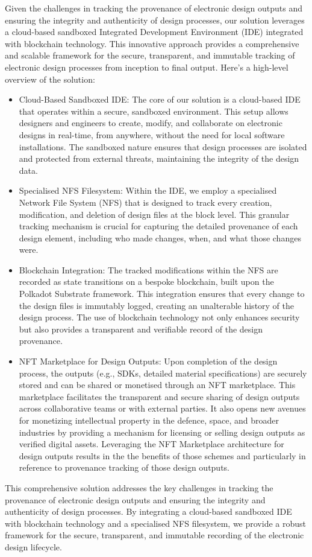 \documentclass{tufte-handout}
\begin{document}
Given the challenges in tracking the provenance of electronic design outputs and ensuring the integrity and authenticity of design processes, our solution
leverages a cloud-based sandboxed Integrated Development Environment (IDE) integrated with blockchain technology. This innovative approach provides a
comprehensive and scalable framework for the secure, transparent, and immutable tracking of electronic design processes from inception to final output. Here's a
high-level overview of the solution:
\begin{itemize}
    \item Cloud-Based Sandboxed IDE: The core of our solution is a cloud-based IDE that operates within a secure, sandboxed environment. This setup allows
    designers and engineers to create, modify, and collaborate on electronic designs in real-time, from anywhere, without the need for local software
    installations. The sandboxed nature ensures that design processes are isolated and protected from external threats, maintaining the integrity
    of the design data.
    \item Specialised NFS Filesystem: Within the IDE, we employ a specialised Network File System (NFS) that is designed to track every creation, modification,
    and deletion of design files at the block level. This granular tracking mechanism is crucial for capturing the detailed provenance of each design element,
    including who made changes, when, and what those changes were.
    \item Blockchain Integration: The tracked modifications within the NFS are recorded as state transitions on a bespoke blockchain, built upon the Polkadot
    Substrate framework. This integration ensures that every change to the design files is immutably logged, creating an unalterable history of the design process.
    The use of blockchain technology not only enhances security but also provides a transparent and verifiable record of the design provenance.
    \item NFT Marketplace for Design Outputs: Upon completion of the design process, the outputs (e.g., SDKs, detailed material specifications) are securely stored
    and can be shared or monetised through an NFT marketplace. This marketplace facilitates the transparent and secure sharing of design outputs across
    collaborative teams or with external parties. It also opens new avenues for monetizing intellectual property in the defence, space, and broader
    industries by providing a mechanism for licensing or selling design outputs as verified digital assets. Leveraging the NFT Marketplace architecture for design
    outputs results in the the benefits of those schemes and particularly in reference to provenance tracking of those design outputs. 
\end{itemize}
This comprehensive solution addresses the key challenges in tracking the provenance of electronic design outputs and ensuring the integrity and authenticity of
design processes. By integrating a cloud-based sandboxed IDE with blockchain technology and a specialised NFS filesystem, we provide a robust framework
for the secure, transparent, and immutable recording of the electronic design lifecycle.   
\end{document}
